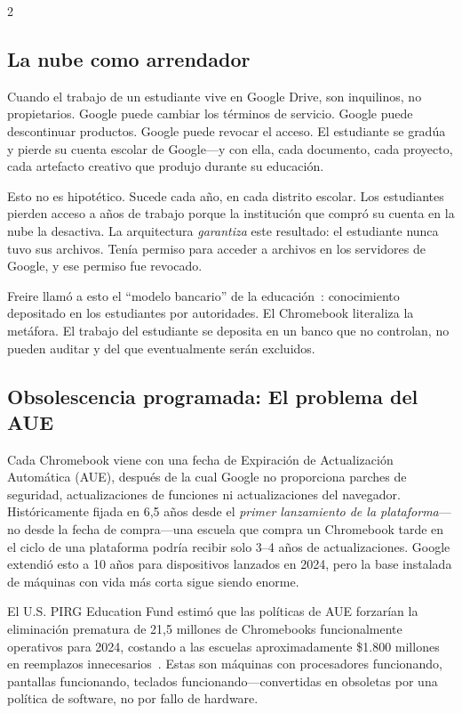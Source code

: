 \documentclass[11pt, a4paper]{article}
\begin{document}
\begin{multicols}{2}
\subsection{La nube como arrendador}

Cuando el trabajo de un estudiante vive en Google Drive, son inquilinos, no propietarios. Google puede cambiar los términos de servicio. Google puede descontinuar productos. Google puede revocar el acceso. El estudiante se gradúa y pierde su cuenta escolar de Google---y con ella, cada documento, cada proyecto, cada artefacto creativo que produjo durante su educación.

Esto no es hipotético. Sucede cada año, en cada distrito escolar. Los estudiantes pierden acceso a años de trabajo porque la institución que compró su cuenta en la nube la desactiva. La arquitectura \emph{garantiza} este resultado: el estudiante nunca tuvo sus archivos. Tenía permiso para acceder a archivos en los servidores de Google, y ese permiso fue revocado.

Freire llamó a esto el ``modelo bancario'' de la educación~\citep{freire1970pedagogy}: conocimiento depositado en los estudiantes por autoridades. El Chromebook literaliza la metáfora. El trabajo del estudiante se deposita en un banco que no controlan, no pueden auditar y del que eventualmente serán excluidos.

\subsection{Obsolescencia programada: El problema del AUE}

Cada Chromebook viene con una fecha de Expiración de Actualización Automática (AUE), después de la cual Google no proporciona parches de seguridad, actualizaciones de funciones ni actualizaciones del navegador. Históricamente fijada en 6,5 años desde el \emph{primer lanzamiento de la plataforma}---no desde la fecha de compra---una escuela que compra un Chromebook tarde en el ciclo de una plataforma podría recibir solo 3--4 años de actualizaciones. Google extendió esto a 10 años para dispositivos lanzados en 2024, pero la base instalada de máquinas con vida más corta sigue siendo enorme.

El U.S. PIRG Education Fund estimó que las políticas de AUE forzarían la eliminación prematura de 21,5 millones de Chromebooks funcionalmente operativos para 2024, costando a las escuelas aproximadamente \$1.800 millones en reemplazos innecesarios~\citep{pirg2023chromebook}. Estas son máquinas con procesadores funcionando, pantallas funcionando, teclados funcionando---convertidas en obsoletas por una política de software, no por fallo de hardware.


\end{multicols}
\end{document}
